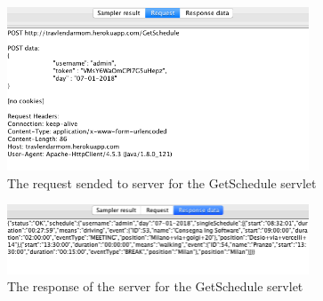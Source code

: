 \documentclass[numbers=noenddot, 12pt, a4paper, oneside]{scrbook}
\begin{document}
\begin{figure}[H]
	\centering
	\includegraphics[width=0.8\textwidth]{Test/GetScheduleReq}
	\caption{The request sended to server for the GetSchedule servlet}
\end{figure}

\begin{figure}[H]
	\centering
	\includegraphics[width=0.8\textwidth]{Test/GetScheduleResp}
	\caption{The response of the server for the GetSchedule servlet}
\end{figure}
\end{document}
